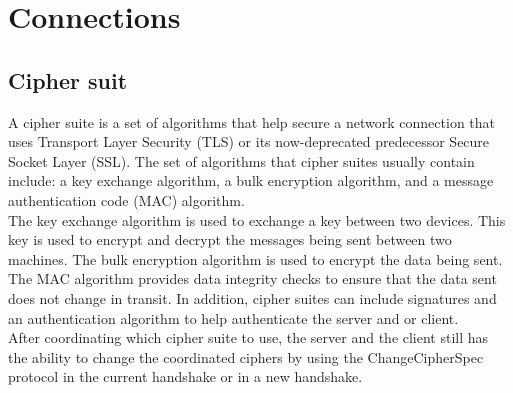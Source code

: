 %
%
%
%
%
%
%
%
%
%


\chapter{Connections}

\section{Cipher suit}
A cipher suite is a set of algorithms that help secure a network connection that uses Transport Layer Security (TLS) or its now-deprecated predecessor Secure Socket Layer (SSL). The set of algorithms that cipher suites usually contain include: a key exchange algorithm, a bulk encryption algorithm, and a message authentication code (MAC) algorithm.\cite{ciphersuit-wiki}
\\
The key exchange algorithm is used to exchange a key between two devices. This key is used to encrypt and decrypt the messages being sent between two machines. The bulk encryption algorithm is used to encrypt the data being sent. The MAC algorithm provides data integrity checks to ensure that the data sent does not change in transit. In addition, cipher suites can include signatures and an authentication algorithm to help authenticate the server and or client.\cite{ciphersuit-wiki}
\\
After coordinating which cipher suite to use, the server and the client still has the ability to change the coordinated ciphers by using the ChangeCipherSpec protocol in the current handshake or in a new handshake.\cite{ciphersuit-wiki}


